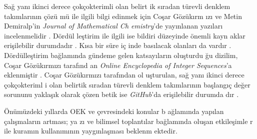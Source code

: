 \documentclass[a4paper,10pt]{article}
\begin{document}
Sa\u{g} yan{\i} ikinci derece \c{c}ok\c{c}okterimli olan belir\-t%
ik s\i radan t\"urevli denklem tak\i mlar{\i}n\i n \c{c}\"o\-z\"u%
m\"u ile ilgili bilgi edinmek i\c{c}in Co\c{s}ar G\"o\-z\"uk\i rm%
{\i}z{\i} ve Metin Demiralp'in \textit{Journal of Mathematical Ch%
emistry}'de yay\i nlanan yaz\i lar{\i} incelenmelidir %
\cite{p1,p2}. D\"ord\"ul%
le\c{s}\-ti\-rim ile ilgili ise bildiri d\"uzeyinde \"onemli kayn%
aklar eri\c{s}ilebilir durum\-da\-d\i r \cite{MD2014Dec}. %
K\i sa bir s\"ure i\c{c}%
inde bas\i lacak olanlar{\i} da vard\i r \cite{cg2015, mek2015}. %
D\"ord\"ulle\c{s}tirim %
ba\u{g}lam\i nda g\"undeme gelen katsay\i lar\i n o\-lu\c{s}turdu%
\u{g}u dizilim, Co\c{s}ar G\"oz\"uk\i rm\i z{\i} ta\-ra\-f\i n\-d%
an \textit{Online Encyclopedia of Integer Sequences}'a 
ek\-len\-mi\c{s}tir \cite{encent, enc}. %
Co\c{s}ar G\"oz\"uk\i rm\i z{\i} ta\-raf\i n\-dan o\-l%
u\c{s}turulan, sa\u{g} yan{\i} ikinci derece \c{c}ok\c{c}okteriml%
i olan belirtik s\i ra\-dan t\"urevli denklem tak\i mlar\i n\i n %
ba\c{s}lang\i \c{c} de\-\u{g}er so\-rununu yakla\c{s}\i k olarak %
\c{c}\"ozen betik ise \textit{GitHub}'da eri\c{s}ilebilir durumda%
d\i r \cite{code}. %

\"On\"um\"uzdeki y\i llarda OEK ve \c{c}ev\-re\-sindeki konular b%
a\u{g}lam\i nda yap\i lan \c{c}al\i \c{s}malar\i n artmas{\i}; ya%
z{\i} ve bilimsel toplant\i lar ba\u{g}lam\i nda olu\c{s}an 
etkile\c{s}imle%
r ile kuram\i n kullan\i m\i n\i n yayg\i nla\c{s}mas{\i} beklenm%
ektedir. %

  


\end{document}
